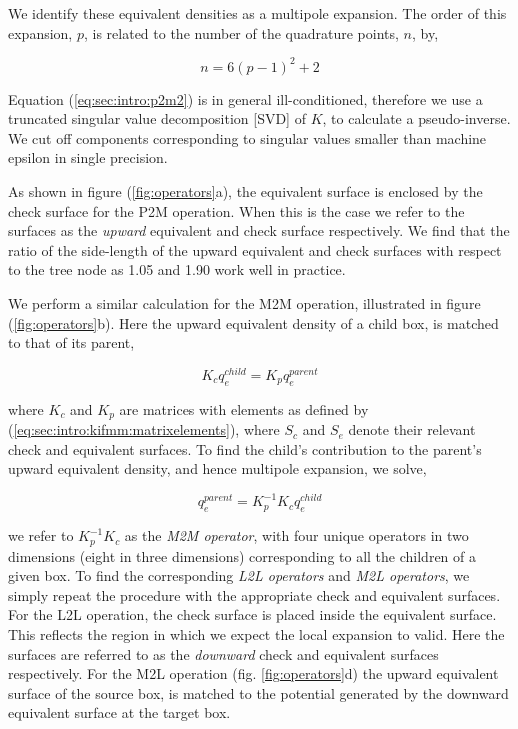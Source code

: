 \documentclass{IEEEcsmag}
\begin{document}
We identify these equivalent densities as a multipole expansion. The order of this expansion, $p$, is related to the number of the quadrature points, $n$, by,

\begin{equation}
	n = 6(p-1)^2+2
	\label{eq:sec:intro:kifmm:nquads}
\end{equation}

Equation (\ref{eq:sec:intro:p2m2}) is in general ill-conditioned, therefore we use a truncated singular value decomposition [SVD] of $K$, to calculate a pseudo-inverse. We cut off components corresponding to singular values smaller than machine epsilon in single precision.

As shown in figure (\ref{fig:operators}a), the equivalent surface is enclosed by the check surface for the P2M operation. When this is the case we refer to the surfaces as the \textit{upward} equivalent and check surface respectively. We find that the ratio of the side-length of the upward equivalent and check surfaces with respect to the tree node as 1.05 and 1.90 work well in practice.

We perform a similar calculation for the M2M operation, illustrated in figure (\ref{fig:operators}b). Here the upward equivalent density of a child box, is matched to that of its parent,

\begin{equation}
	K_c q_e^{child} = K_p q_e ^{parent}
\end{equation}

where $K_c$ and $K_p$ are matrices with elements as defined by (\ref{eq:sec:intro:kifmm:matrixelements}), where $S_c$ and $S_e$ denote their relevant check and equivalent surfaces. To find the child's contribution to the parent's upward equivalent density, and hence multipole expansion, we solve,

\begin{equation}
	q_e^{parent} = K_p^{-1}K_c q_e^{child}
\end{equation}

we refer to $K_p^{-1}K_c$ as the \textit{M2M operator}, with four unique operators in two dimensions (eight in three dimensions) corresponding to all the children of a given box. To find the corresponding \textit{L2L operators} and \textit{M2L operators}, we simply repeat the procedure with the appropriate check and equivalent surfaces. For the L2L operation, the check surface is placed inside the equivalent surface. This reflects the region in which we expect the local expansion to valid. Here the surfaces are referred to as the \textit{downward} check and equivalent surfaces respectively. For the M2L operation (fig. \ref{fig:operators}d) the upward equivalent surface of the source box, is matched to the potential generated by the downward equivalent surface at the target box.
\end{document}
